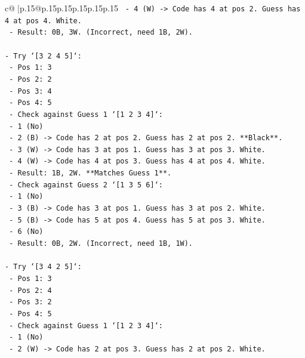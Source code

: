 \documentclass{article}
\begin{document}
{\begin{supertabular}{c@{$\;$}|p{.15\linewidth}@{}p{.15\linewidth}p{.15\linewidth}p{.15\linewidth}p{.15\linewidth}p{.15\linewidth}}
{{{\texttt{        {-}   4 (W) {-}> Code has 4 at pos 2. Guess has 4 at pos 4. White.} \\
\texttt{        {-}   Result: 0B, 3W. (Incorrect, need 1B, 2W).} \\
\\ 
\texttt{{-}   Try `{[}3 2 4 5{]}`:} \\
\texttt{    {-}   Pos 1: 3} \\
\texttt{    {-}   Pos 2: 2} \\
\texttt{    {-}   Pos 3: 4} \\
\texttt{    {-}   Pos 4: 5} \\
\texttt{    {-}   Check against Guess 1 `{[}1 2 3 4{]}`:} \\
\texttt{        {-}   1 (No)} \\
\texttt{        {-}   2 (B) {-}> Code has 2 at pos 2. Guess has 2 at pos 2. **Black**.} \\
\texttt{        {-}   3 (W) {-}> Code has 3 at pos 1. Guess has 3 at pos 3. White.} \\
\texttt{        {-}   4 (W) {-}> Code has 4 at pos 3. Guess has 4 at pos 4. White.} \\
\texttt{        {-}   Result: 1B, 2W. **Matches Guess 1**.} \\
\texttt{    {-}   Check against Guess 2 `{[}1 3 5 6{]}`:} \\
\texttt{        {-}   1 (No)} \\
\texttt{        {-}   3 (B) {-}> Code has 3 at pos 1. Guess has 3 at pos 2. White.} \\
\texttt{        {-}   5 (B) {-}> Code has 5 at pos 4. Guess has 5 at pos 3. White.} \\
\texttt{        {-}   6 (No)} \\
\texttt{        {-}   Result: 0B, 2W. (Incorrect, need 1B, 1W).} \\
\\ 
\texttt{{-}   Try `{[}3 4 2 5{]}`:} \\
\texttt{    {-}   Pos 1: 3} \\
\texttt{    {-}   Pos 2: 4} \\
\texttt{    {-}   Pos 3: 2} \\
\texttt{    {-}   Pos 4: 5} \\
\texttt{    {-}   Check against Guess 1 `{[}1 2 3 4{]}`:} \\
\texttt{        {-}   1 (No)} \\
\texttt{        {-}   2 (W) {-}> Code has 2 at pos 3. Guess has 2 at pos 2. White.} \\
}}}
\end{supertabular}}
\end{document}
